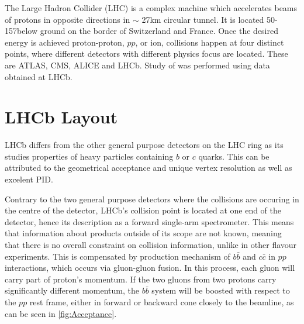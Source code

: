 The Large Hadron Collider (LHC) is a complex machine which accelerates beams of protons in opposite directions in $\sim$ 27km circular tunnel. It is located
50-157\m below ground on the border of Switzerland and France. Once the desired energy is achieved proton-proton, $pp$, or ion, collisions happen at four distinct points, where different detectors with different physics focus are located. These are \Gls{ATLAS}, \Gls{CMS}, \Gls{ALICE} and \Gls{LHCb}. 
Study of \Bmumumu was performed using data obtained at \Gls{LHCb}. 

\section{LHCb Layout}

\Gls{LHCb} differs from the other general purpose detectors on the LHC ring as its studies properties of heavy particles containing $b$ or $c$ quarks. This can be attributed to the geometrical acceptance and unique vertex resolution as well as excelent \Gls{PID}.

Contrary to the two general purpose detectors where the collisions are occuring in the centre of the detector, \Gls{LHCb}'s collision point is located at one end of the detector, hence its description as a forward single-arm spectrometer. This means that information about products outside of its scope are not known, meaning that there is no overall constraint on collision information, unlike in other flavour experiments. This is compensated by production mechanism of $b\bar{b}$ and $c\bar{c}$ in $pp$ interactions, which occurs via gluon-gluon fusion. In this process, each gluon will carry part of proton's momentum. If the two gluons from two protons carry significantly different momentum, the $b\bar{b}$ system will be boosted with respect to the $pp$ rest frame, either in forward or backward cone closely to the beamline, as can be seen in \autoref{fig:Acceptance}.

